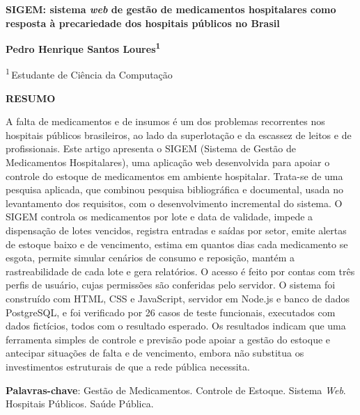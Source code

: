 \documentclass[12pt,a4paper]{article}
\begin{document}
\thispagestyle{empty}

\begin{center}
  {\large\bfseries SIGEM: sistema \textit{web} de gestão de medicamentos hospitalares como resposta à precariedade dos hospitais públicos no Brasil\par}
  \vspace{1.2cm}
  {\bfseries Pedro Henrique Santos Loures\textsuperscript{1}\par}
  \vspace{0.2cm}
  {\textsuperscript{1}\,Estudante de Ciência da Computação\par}
\end{center}

\vspace{1cm}

\begin{singlespace}
\noindent\textbf{RESUMO}

\smallskip
\noindent A falta de medicamentos e de insumos é um dos problemas recorrentes nos hospitais públicos brasileiros, ao lado da superlotação e da escassez de leitos e de profissionais. Este artigo apresenta o SIGEM (Sistema de Gestão de Medicamentos Hospitalares), uma aplicação web desenvolvida para apoiar o controle do estoque de medicamentos em ambiente hospitalar. Trata-se de uma pesquisa aplicada, que combinou pesquisa bibliográfica e documental, usada no levantamento dos requisitos, com o desenvolvimento incremental do sistema. O SIGEM controla os medicamentos por lote e data de validade, impede a dispensação de lotes vencidos, registra entradas e saídas por setor, emite alertas de estoque baixo e de vencimento, estima em quantos dias cada medicamento se esgota, permite simular cenários de consumo e reposição, mantém a rastreabilidade de cada lote e gera relatórios. O acesso é feito por contas com três perfis de usuário, cujas permissões são conferidas pelo servidor. O sistema foi construído com HTML, CSS e JavaScript, servidor em Node.js e banco de dados PostgreSQL, e foi verificado por 26 casos de teste funcionais, executados com dados fictícios, todos com o resultado esperado. Os resultados indicam que uma ferramenta simples de controle e previsão pode apoiar a gestão do estoque e antecipar situações de falta e de vencimento, embora não substitua os investimentos estruturais de que a rede pública necessita.

\medskip
\noindent\textbf{Palavras-chave}: Gestão de Medicamentos. Controle de Estoque. Sistema \textit{Web}. Hospitais Públicos. Saúde Pública.
\end{singlespace}
\end{document}
